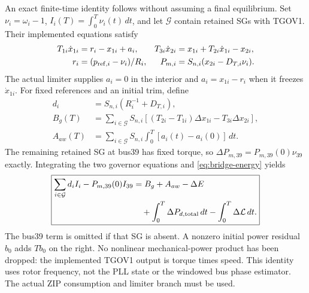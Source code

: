 \documentclass[11pt]{article}
\begin{document}
An exact finite-time identity follows without assuming a final equilibrium.
Set $\nu_i=\omega_i-1$, $I_i(T)=\int_0^T\nu_i(t)\,dt$, and let $\mathcal G$
contain retained SGs with TGOV1. Their implemented equations satisfy
\begin{align}
 T_{1i}\dot x_{1i}&=r_i-x_{1i}+a_i,&
 T_{3i}\dot x_{2i}&=x_{1i}+T_{2i}\dot x_{1i}-x_{2i},\nonumber\\
 r_i&=(p_{{\rm ref},i}-\nu_i)/R_i,&
 P_{m,i}&=S_{n,i}(x_{2i}-D_{T,i}\nu_i).
\end{align}
The actual limiter supplies $a_i=0$ in the interior and
$a_i=x_{1i}-r_i$ when it freezes $\dot x_{1i}$. For fixed references and
an initial trim, define
\begin{align}
 d_i&=S_{n,i}(R_i^{-1}+D_{T,i}),\nonumber\\
 B_g(T)&=\sum_{i\in\mathcal G}S_{n,i}
 [(T_{2i}-T_{1i})\Delta x_{1i}-T_{3i}\Delta x_{2i}],\nonumber\\
 A_{aw}(T)&=\sum_{i\in\mathcal G}S_{n,i}
 \int_0^T[a_i(t)-a_i(0)]\,dt.
\end{align}
The remaining retained SG at bus39 has fixed torque, so
$\Delta P_{m,39}=P_{m,39}(0)\nu_{39}$ exactly. Integrating the two governor
equations and \eqref{eq:bridge-energy} yields
\begin{equation}
 \boxed{\begin{aligned}
 \sum_{i\in\mathcal G}d_iI_i-P_{m,39}(0)I_{39}
 &=B_g+A_{aw}-\Delta E\\
 &\quad+\int_0^T\Delta P_{d,\rm total}\,dt
       -\int_0^T\Delta\mathcal L\,dt .
 \end{aligned}}\label{eq:bridge-finite-area}
\end{equation}
The bus39 term is omitted if that SG is absent. A nonzero initial power
residual $b_0$ adds $Tb_0$ on the right. No nonlinear mechanical-power product
has been dropped: the implemented TGOV1 output is torque times speed.
This identity uses rotor frequency, not the PLL state or the windowed bus
phase estimator. The actual ZIP consumption and limiter branch must be used.
\end{document}
